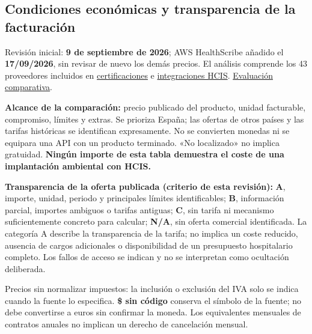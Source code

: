 \clearpage
\begin{landscape}
\section{Condiciones económicas y transparencia de la facturación}
\label{app:precios}
\begingroup\footnotesize

Revisión inicial: \textbf{9 de septiembre de 2026}; AWS HealthScribe añadido el \textbf{17/\allowbreak{}09/\allowbreak{}2026}, sin revisar de nuevo los demás precios. El análisis comprende los 43 proveedores incluidos en \hyperref[app:proveedores]{certificaciones} e \hyperref[app:hcis]{integraciones HCIS}. \hyperref[sec:candidatos]{Evaluación comparativa}.

\textbf{Alcance de la comparación:} precio publicado del producto, unidad facturable, compromiso, límites y extras. Se prioriza España; las ofertas de otros países y las tarifas históricas se identifican expresamente. No se convierten monedas ni se equipara una API con un producto terminado. «No localizado» no implica gratuidad. \textbf{Ningún importe de esta tabla demuestra el coste de una implantación ambiental con HCIS.}

\textbf{Transparencia de la oferta publicada (criterio de esta revisión):} \textbf{A}, importe, unidad, periodo y principales límites identificables; \textbf{B}, información parcial, importes ambiguos o tarifas antiguas; \textbf{C}, sin tarifa ni mecanismo suficientemente concreto para calcular; \textbf{N/\allowbreak{}A}, sin oferta comercial identificada. La categoría A describe la transparencia de la tarifa; no implica un coste reducido, ausencia de cargos adicionales o disponibilidad de un presupuesto hospitalario completo. Los fallos de acceso se indican y no se interpretan como ocultación deliberada.

Precios sin normalizar impuestos: la inclusión o exclusión del IVA solo se indica cuando la fuente lo especifica. \textbf{\$ sin código} conserva el símbolo de la fuente; no debe convertirse a euros sin confirmar la moneda. Los equivalentes mensuales de contratos anuales no implican un derecho de cancelación mensual.


\end{landscape}
